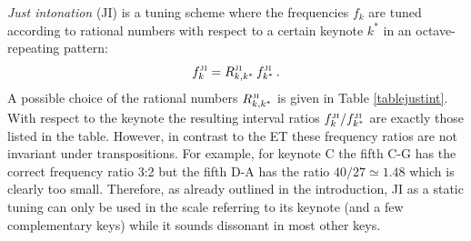 \textit{Just intonation} (JI) is a tuning scheme where the frequencies $f_k$ are tuned according to rational numbers with respect to a certain keynote $k^*$ in an octave-repeating pattern:
%
\begin{equation}
f^{\rm\scriptscriptstyle JI}_k = R^{\rm\scriptscriptstyle JI}_{k,k^*} \, f^{\rm\scriptscriptstyle JI}_{k^*}\,.
\end{equation}
%
A possible choice of the rational numbers $R^{\rm\scriptscriptstyle JI}_{k,k^*}$ is given in Table \ref{tablejustint}. With respect to the keynote the resulting interval ratios $f^{\rm\scriptscriptstyle JI}_k/f^{\rm\scriptscriptstyle JI}_{k^*}$ are exactly those listed in the table. However, in contrast to the ET these frequency ratios are not invariant under transpositions. For example, for keynote C the fifth C-G has the correct frequency ratio 3:2 but the fifth D-A has the ratio $40/27 \simeq 1.48$ which is clearly too small. Therefore, as already outlined in the introduction, JI as a static tuning can only be used in the scale referring to its keynote (and a few complementary keys) while it sounds dissonant in most other keys. 

